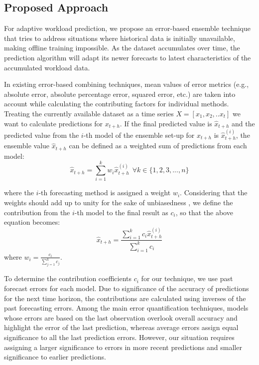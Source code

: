\subsection{Proposed Approach}

For adaptive workload prediction, we propose an error-based ensemble technique that tries to address situations where historical data is initially unavailable, making offline training impossible. As the dataset accumulates over time, the prediction algorithm will adapt its newer forecasts to latest characteristics of the accumulated workload data.

In existing error-based combining techniques, mean values of error metrics (e.g., absolute error, absolute percentage error, squared error, etc.) are taken into account while calculating the contributing factors for individual methods. 
Treating the currently available dataset as a time series
$X=[x_{1},x_{2},.. x_{t}]$
we want to calculate predictions for $x_{t+h}$. If the final predicted value is $\hat{x}_{t+h}$ and the predicted value from the $i$-th model of the ensemble set-up for $x_{t+h}$ is $\hat{x}_{t+h}^{(i)}$, the ensemble value $\hat{x}_{t+h}$ can be defined as a weighted sum of predictions from each model:
\begin{equation}
\hat{x}_{t+h}= \sum_{i=1}^{k}w_i \hat{x}_{t+h}^{(i)} \ \ \forall k \in \{1,2,3,...,n\}
\end{equation}

where the $i$-th forecasting method is assigned a weight $w_i$. Considering that the weights should add up to unity for the sake of unbiasedness \cite{Adhikari_2012}, we define the contribution from the $i$-th model to the final result as $c_i$, so that the above equation becomes:
\begin{equation}
\hat{x}_{t+h}= \frac{\sum_{i=1}^{k}c_i \hat{x}_{t+h}^{(i)}}{\sum_{i=1}^{k}c_i}
\end{equation}
where $w_{i}= \frac{c_{i}}{\sum_{j=1}^{k}c_j}$.

To determine the contribution coefficients $c_i$ for our technique, we use past forecast errors for each model. Due to significance of the accuracy of predictions for the next time horizon, the contributions are calculated using inverses of the past forecasting errors. Among the main error quantification techniques, models whose errors are based on the last observation overlook overall accuracy and highlight the error of the last prediction, whereas  average errors assign equal significance to all the last prediction errors. However, our situation requires assigning a larger significance to errors in more recent predictions and smaller significance to earlier predictions.

